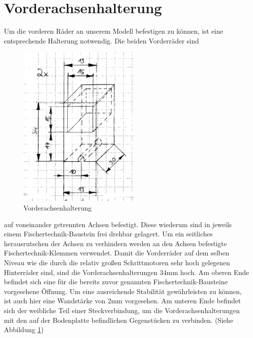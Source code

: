 \section{Vorderachsenhalterung}
Um die vorderen Räder an unserem Modell befestigen zu können, ist eine entsprechende Halterung notwendig. Die beiden Vorderräder sind 
\begin{figure}
	\includegraphics[width=6cm,angle=0]{content/pictures/vorderachsenhalterung.png}
	\caption{Vorderachsenhalterung}
	\label{fig:vorderachsenhalterung}
\end{figure}
auf voneinander getrennten Achsen befestigt. Diese wiederum sind in jeweils einem Fischertechnik-Baustein frei drehbar gelagert. Um ein seitliches herausrutschen der Achsen zu verhindern werden an den Achsen befestigte Fischertechnik-Klemmen verwendet. Damit die Vorderräder auf dem selben Niveau wie die durch die relativ großen Schrittmotoren sehr hoch gelegenen Hinterräder sind, sind die Vorderachsenhalterungen 34mm hoch. Am oberen Ende befindet sich eine für die bereits zuvor genannten Fischertechnik-Bausteine vorgesehene Öffnung. Um eine ausreichende Stabilität gewährleisten zu können, ist auch hier eine Wandstärke von 2mm vorgesehen. Am unteren Ende befindet sich der weibliche Teil einer Steckverbindung, um die Vorderachsenhalterungen mit den auf der Bodenplatte befindlichen Gegenstücken zu verbinden. (Siehe Abbildung \ref{fig:vorderachsenhalterung})

